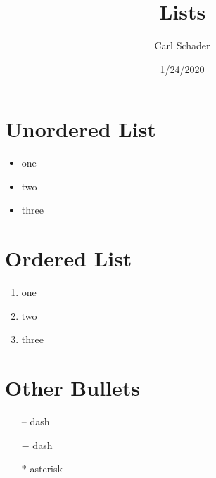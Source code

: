 \documentclass{article}
\title{Lists}
\date{1/24/2020}
\author{Carl Schader}
\begin{document}
	\maketitle

	\section{Unordered List}
	\begin{itemize}
		\item one
		\item two
		\item three
	\end{itemize}

	\section{Ordered List}
	\begin{enumerate}
		\item one
		\item two
		\item three
	\end{enumerate}

	\section{Other Bullets}
	\begin{itemize}
		\item[--] dash
		\item[$-$] dash
		\item[$\ast$] asterisk
	\end{itemize}

\end{document}

